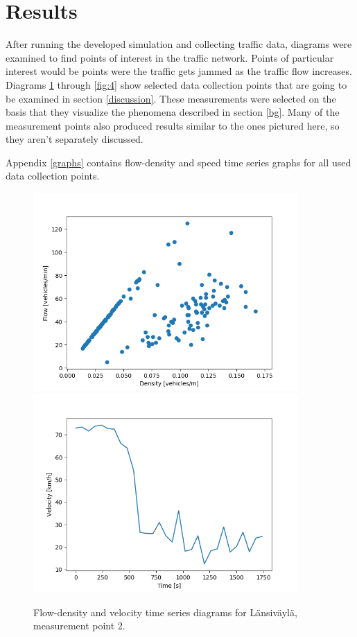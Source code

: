 \documentclass[english, 12pt, a4paper, elec, utf8, pdfa, online]{aaltothesis}
\begin{document}
\clearpage

\section{Results} \label{res}

After running the developed simulation and collecting traffic data, diagrams were examined to find points of interest in the traffic network. Points of particular interest would be points were the traffic gets jammed as the traffic flow increases. Diagrams \ref{fig:1} through \ref{fig:4} show selected data collection points that are going to be examined in section \ref{discussion}. These measurements were selected on the basis that they visualize the phenomena described in section \ref{bg}. Many of the measurement points also produced results similar to the ones pictured here, so they aren't separately discussed.

Appendix \ref{graphs} contains flow-density and speed time series graphs for all used data collection points.

\begin{figure}[ht!]
    \centering
    \includegraphics[width=0.9\textwidth]{graphs/Lansivayla_2_flw_dns.png}
    \includegraphics[width=0.9\textwidth]{graphs/Lansivayla_2_spd_time_4.png}
    \caption{Flow-density and velocity time series diagrams for Länsiväylä, measurement point 2.}
    \label{fig:1}
\end{figure}
\end{document}
